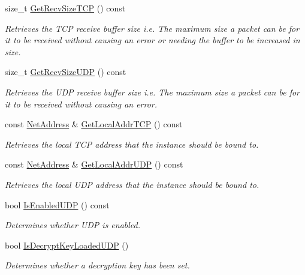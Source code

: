 \begin{DoxyCompactItemize}
size\_\-t \hyperlink{class_net_instance_profile_a34189e13e8b5a89800f0aa512c80fdb1}{GetRecvSizeTCP} () const 
\begin{DoxyCompactList}\small\item\em Retrieves the TCP receive buffer size i.e. The maximum size a packet can be for it to be received without causing an error or needing the buffer to be increased in size. \item\end{DoxyCompactList}\item 
size\_\-t \hyperlink{class_net_instance_profile_ac93208f09c1034d1ff7b9b4318f60b21}{GetRecvSizeUDP} () const 
\begin{DoxyCompactList}\small\item\em Retrieves the UDP receive buffer size i.e. The maximum size a packet can be for it to be received without causing an error. \item\end{DoxyCompactList}\item 
const \hyperlink{class_net_address}{NetAddress} \& \hyperlink{class_net_instance_profile_a584ba16218e7d6340eebfefaba180477}{GetLocalAddrTCP} () const 
\begin{DoxyCompactList}\small\item\em Retrieves the local TCP address that the instance should be bound to. \item\end{DoxyCompactList}\item 
const \hyperlink{class_net_address}{NetAddress} \& \hyperlink{class_net_instance_profile_a6a74c2b832b5662de13b5e23370129f8}{GetLocalAddrUDP} () const 
\begin{DoxyCompactList}\small\item\em Retrieves the local UDP address that the instance should be bound to. \item\end{DoxyCompactList}\item 
bool \hyperlink{class_net_instance_profile_aa5a2c1ea8752efc51c70a41bb3ecbb20}{IsEnabledUDP} () const 
\begin{DoxyCompactList}\small\item\em Determines whether UDP is enabled. \item\end{DoxyCompactList}\item 
bool \hyperlink{class_net_instance_profile_ae7b72771c67facf3e4b5893b71f82b64}{IsDecryptKeyLoadedUDP} ()
\begin{DoxyCompactList}\small\item\em Determines whether a decryption key has been set. \item\end{DoxyCompactList}\item 

\end{DoxyCompactItemize}
